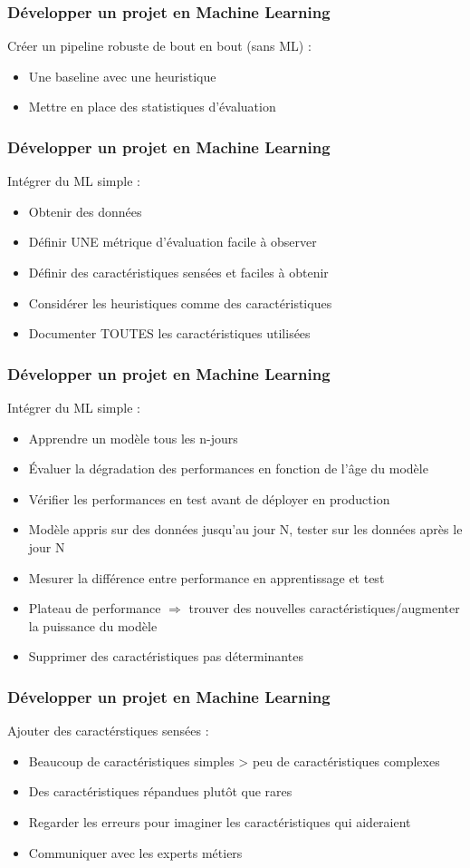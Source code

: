 \begin{frame}
  \frametitle{Développer un projet en Machine Learning}
  Créer un pipeline robuste de bout en bout (sans ML) :
  \begin{itemize}
  \item Une baseline avec une heuristique
  \item Mettre en place des statistiques d'évaluation
  \end{itemize}
\end{frame}

\begin{frame}
  \frametitle{Développer un projet en Machine Learning}
  Intégrer du ML simple :
  \begin{itemize}
  \item Obtenir des données
  \item Définir UNE métrique d'évaluation facile à observer
  \item Définir des caractéristiques sensées et faciles à obtenir
  \item Considérer les heuristiques comme des caractéristiques
  \item Documenter TOUTES les caractéristiques utilisées
  \end{itemize}
\end{frame}

\begin{frame}
  \frametitle{Développer un projet en Machine Learning}
  Intégrer du ML simple :
  \begin{itemize}
  \item Apprendre un modèle tous les n-jours
  \item Évaluer la dégradation des performances en fonction de l'âge du modèle
  \item Vérifier les performances en test avant de déployer en production
  \item Modèle appris sur des données jusqu'au jour N, tester sur les données après le jour N
  \item Mesurer la différence entre performance en apprentissage et test
  \item Plateau de performance $\Rightarrow$ trouver des nouvelles caractéristiques/augmenter la puissance du modèle
  \item Supprimer des caractéristiques pas déterminantes
  \end{itemize}
\end{frame}

\begin{frame}
  \frametitle{Développer un projet en Machine Learning}
  Ajouter des caractérstiques sensées :
  \begin{itemize}
  \item Beaucoup de caractéristiques simples > peu de caractéristiques complexes
  \item Des caractéristiques répandues plutôt que rares
  \item Regarder les erreurs pour imaginer les caractéristiques qui aideraient
  \item Communiquer avec les experts métiers
  \end{itemize}
\end{frame}


